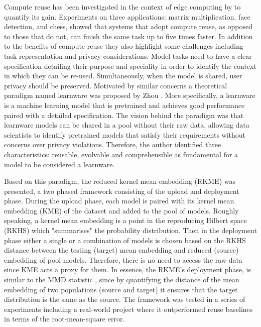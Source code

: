 \documentclass{mpaper}
\begin{document}
Compute reuse has been investigated in the context of edge computing by \cite{ComputeReuse} to quantify its gain. Experiments on three applications: matrix multiplication, face detection, and chess, showed that systems that adopt compute reuse, as opposed to those that do not, can finish the same task up to five times faster. In addition to the benefits of compute reuse they also highlight some challenges including task representation and privacy considerations. Model tasks need to have a clear specification detailing their purpose and speciality in order to identify the context in which they can be re-used. Simultaneously, when the model is shared, user privacy should be preserved. Motivated by similar concerns a theoretical paradigm named learnware was proposed by Zhou \cite{Learnware}. More specifically, a learnware is a machine learning model that is pretrained and achieves good performance paired with a detailed specification. The vision behind the paradigm was that learnware models can be shared in a pool without their raw data, allowing data scientists to identify pretrained models that satisfy their requirements without concerns over privacy violations. Therefore, the author identified three characteristics: reusable, evolvable and comprehensible as fundamental for a model to be considered a learnware.  

Based on this paradigm, the reduced kernel mean embedding (RKME) \cite{KernelMMD} was presented, a two phased framework consisting of the upload and deployment phase. During the upload phase, each model is paired with its kernel mean embedding (KME) of the dataset and added to the pool of models. Roughly speaking, a kernel mean embedding is a point in the reproducing Hilbert space (RKHS) which "summarises" the probability distribution. Then in the deployment phase either a single or a combination of models is chosen based on the RKHS distance between the testing (target) mean embedding and reduced (source) embedding of pool models. Therefore, there is no need to access the raw data since KME acts a proxy for them. In essence, the RKME's deployment phase, is similar to the MMD statistic \cite{OriginalMMD}, since by quantifying the distance of the mean embedding of two populations (source and target) it ensures that the target distribution is the same as the source. The framework was tested in a series of experiments including a real-world project where it outperformed reuse baselines in terms of the root-mean-square error.
\end{document}
